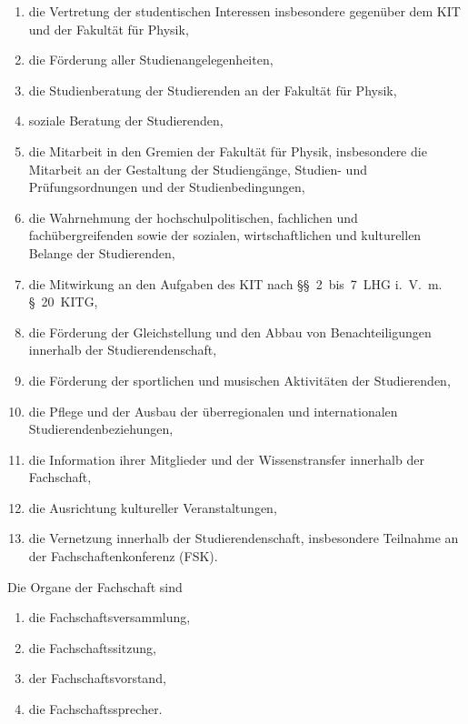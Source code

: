 \documentclass[a4paper,parskip=half,numbers=noenddot]{scrartcl}
\begin{document}
\begin{contract}
\begin{enumerate}
\item die Vertretung der studentischen Interessen insbesondere gegenüber dem KIT und der Fakultät für Physik,
\item die Förderung aller Studienangelegenheiten,
\item die Studienberatung der Studierenden an der Fakultät für Physik,
\item soziale Beratung der Studierenden,
\item die Mitarbeit in den Gremien der Fakultät für Physik, insbesondere die Mitarbeit an der Gestaltung der Studiengänge, Studien- und Prüfungsordnungen und der Studienbedingungen,
\item die Wahrnehmung der hochschulpolitischen, fachlichen und fachübergreifenden sowie der sozialen, wirtschaftlichen und kulturellen Belange der Studierenden,
\item die Mitwirkung an den Aufgaben des KIT nach §§~2~bis~7~LHG i.~V.~m. §~20~KITG,
\item die Förderung der Gleichstellung und den Abbau von Benachteiligungen innerhalb der Studierendenschaft,
\item die Förderung der sportlichen und musischen Aktivitäten der Studierenden,
\item die Pflege und der Ausbau der überregionalen und internationalen Studierendenbeziehungen,
\item die Information ihrer Mitglieder und der Wissenstransfer innerhalb der Fachschaft,
\item die Ausrichtung kultureller Veranstaltungen,
\item die Vernetzung innerhalb der Studierendenschaft, insbesondere Teilnahme an der Fachschaftenkonferenz (FSK).

\end{enumerate}


%
%


\pagebreak
{}

Die Organe der Fachschaft sind

  \begin{enumerate}
  \item die Fachschaftsversammlung,
  \item die Fachschaftssitzung,
  \item der Fachschaftsvorstand,
  \item die Fachschaftssprecher.
  \end{enumerate}


\end{contract}
\end{document}
